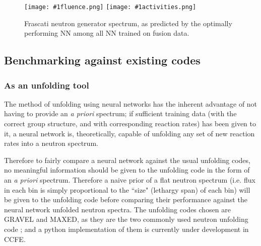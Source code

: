 \documentclass[a4paper, 12pt]{article}
\newcommand{\fluenceandactivities}[1]{
\texttt{[image: \#1fluence.png]}
\texttt{[image: \#1activities.png]}
}
\begin{document}
\begin{figure}[H]
\centering
\fluenceandactivities{/home/ocean/Documents/GitHubDir/unfolding/unfolding/unfoldingsuite/neuralnetwork/realoutputEarlyStopping/SelectedNNreplicated/fusion-fusion/0927_0220_5_layerfinal_inv_5_test_000_}
\caption{Frascati neutron generator spectrum, as predicted by the optimally performing NN among all NN trained on fusion data.}\label{5Layerfusion-fusionFNG}
\end{figure}



\subsection{Benchmarking against existing codes}
\subsubsection{As an unfolding tool}\label{As an unfolding tool}
    The method of unfolding using neural networks has the inherent advantage of not having to provide an \emph{a priori} spectrum; if sufficient training data (with the correct group structure, and with corresponding reaction rates) has been given to it, a neural network is, theoretically, capable of unfolding any set of new reaction rates into a neutron spectrum. 

    Therefore to fairly compare a neural network against the usual unfolding codes, no meaningful information should be given to the unfolding code in the form of an \emph{a priori} spectrum. Therefore a naive prior of a flat neutron spectrum (i.e. flux in each bin is simply proportional to the ``size" (lethargy span) of each bin) will be given to the unfolding code before comparing their performance against the neural network unfolded neutron spectra. The unfolding codes chosen are GRAVEL and MAXED, as they are the two commonly used neutron unfolding code \cite{LWP_LTIS} \cite{bethColling_TBMD}; and a python implementation of them is currently under development in CCFE.
\end{document}
